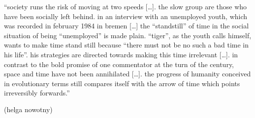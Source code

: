 \documentclass[12pt,a4paper,british,landscape]{article}
\begin{document}
{\fontsize{1.115cm}{1.2cm}\selectfont

``society runs the risk of moving at two speeds [\dots].
the slow group are those who have been socially left behind.
in an interview with an unemployed youth, which was recorded in february 1984 in bremen [\dots] the ``standstill'' of time in the social situation of being ``unemployed'' is made plain.
``tiger'', as the youth calls himself, wants to make time stand still because ``there must not be no such a bad time in his life''.
his strategies are directed towards making this time irrelevant [\dots].
in contrast to the bold promise of one commentator at the turn of the century, space and time have not been annihilated [\dots].
the progress of humanity conceived in evolutionary terms still compares itself with the arrow of time which points irreversibly forwards.''

\vspace{0.25cm}

\begin{center}
(helga nowotny)
\end{center}

}
\end{document}

